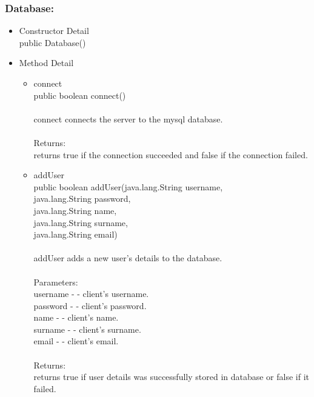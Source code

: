 \documentclass[letterpaper]{article}
\begin{document}
						\subsubsection*{Database:}
						\vspace{0.1in}	
							\begin{itemize}
								\item	Constructor Detail \\
										public Database()
								\item	Method Detail
										\begin{itemize}
											\item	connect \\
													public boolean connect() \\ \\
													connect connects the server to the mysql database. \\ \\
													Returns: \\
													returns true if the connection succeeded and false if the connection failed.
											\item	addUser \\
													public boolean addUser(java.lang.String username, \\
				              java.lang.String password, \\
				              java.lang.String name, \\
				              java.lang.String surname, \\
				              java.lang.String email) \\ \\
													addUser adds a new user's details to the database. \\ \\
													Parameters: \\
													username - - client's username. \\
													password - - client's password. \\
													name - - client's name. \\ 
													surname - - client's surname. \\
													email - - client's email. \\ \\
													Returns: \\
													returns true if user details was successfully stored in database or false if it failed.

\end{itemize}
\end{itemize}
\end{document}
